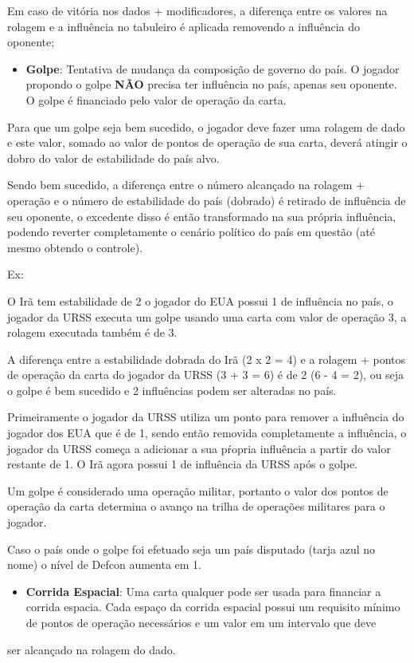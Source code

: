 \documentclass[11pt]{article}
\begin{document}
Em caso de vitória nos dados + modificadores, a diferença entre os valores na rolagem e a influência no tabuleiro é aplicada removendo a influência do oponente;

\begin{itemize}
\item \textbf{Golpe}: Tentativa de mudança da composição de governo do país. O jogador propondo o golpe \textbf{NÃO} precisa ter influência no país, apenas seu oponente. O golpe é financiado pelo valor de operação da carta.
\end{itemize}

Para que um golpe seja bem sucedido, o jogador deve fazer uma rolagem de dado e este valor, somado ao valor de pontos de operação de sua carta, deverá atingir o dobro do valor de estabilidade do país alvo.

Sendo bem sucedido, a diferença entre o número alcançado na rolagem + operação e o número de estabilidade do país (dobrado) é retirado de influência de seu oponente, o excedente disso é então transformado na
sua própria influência, podendo reverter completamente o cenário político do país em questão (até mesmo obtendo o controle).

Ex:

O Irã tem estabilidade de 2 o jogador do EUA possui 1 de influência no país, o jogador da URSS executa um golpe usando uma carta com valor de operação 3, a rolagem executada também é de 3.

A diferença entre a estabilidade dobrada do Irã (2 x 2 = 4) e a rolagem + pontos de operação da carta do jogador da URSS (3 + 3 = 6) é de 2 (6 - 4 = 2), ou seja o golpe é bem sucedido e 2 influências podem ser alteradas no
país.

Primeiramente o jogador da URSS utiliza um ponto para remover a influência do jogador dos EUA que é de 1, sendo então removida completamente a influência, o jogador da URSS começa a adicionar a sua pŕopria
influência a partir do valor restante de 1. O Irã agora possui 1 de influência da URSS após o golpe.

Um golpe é considerado uma operação militar, portanto o valor dos pontos de operação da carta determina o avanço na trilha de operações militares para o jogador.

Caso o país onde o golpe foi efetuado seja um país disputado (tarja azul no nome) o nível de Defcon aumenta em 1.

\begin{itemize}
\item \textbf{Corrida Espacial}: Uma carta qualquer pode ser usada para financiar a corrida espacia. Cada espaço da corrida espacial possui um requisito mínimo de pontos de operação necessários e um valor em um intervalo que deve
\end{itemize}
ser alcançado na rolagem do dado.
\end{document}
